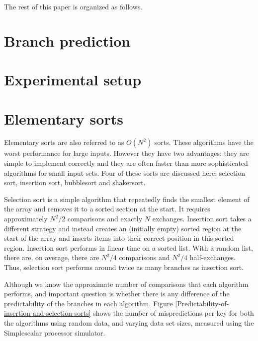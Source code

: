 \documentclass[acmtocl]{acmtrans2m}
\begin{document}
The rest of this paper is organized as follows.

\section{Branch prediction}

\section{Experimental setup}

\section{Elementary sorts}
\label{ordernsquared}
Elementary sorts are also referred to as $O(N^2)$ sorts. These
algorithms have the worst performance for large inputs. However they
have two advantages: they are simple to implement correctly and they
are often faster than more sophisticated algorithms for small input
sets. Four of these sorts are discussed here: selection sort,
insertion sort, bubblesort and shakersort.

Selection sort is a simple algorithm that repeatedly finds the
smallest element of the array and removes it to a sorted section at
the start. It requires approximately $N^2/2$ comparisons and exactly
$N$ exchanges. Insertion sort takes a different strategy and instead
creates an (initially empty) sorted region at the start of the array
and inserts items into their correct position in this sorted region.
Insertion sort performs in linear time on a sorted list. With a random
list, there are, on average, there are $N^2/4$ comparisons and $N^2/4$
half-exchanges. Thus, selection sort performs around twice as many
branches as insertion sort.

Although we know the approximate number of comparisons that each
algorithm performs, and important question is whether there is any
difference of the predictability of the branches in each algorithm.
Figure \ref{Predictability-of-insertion-and-selection-sorts} shows the number of mispredictions per key for both the
algorithms using random data, and varying data set sizes, measured
using the Simplescalar processor simulator.
\end{document}
